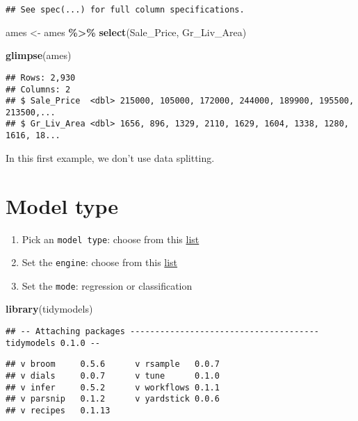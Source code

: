 \documentclass[
]{book}
\newenvironment{Shaded}{\begin{snugshade}}{\end{snugshade}}
\newcommand{\KeywordTok}[1]{\textcolor[rgb]{0.13,0.29,0.53}{\textbf{#1}}}
\newcommand{\NormalTok}[1]{#1}
\newcommand{\OperatorTok}[1]{\textcolor[rgb]{0.81,0.36,0.00}{\textbf{#1}}}
\newcommand{\StringTok}[1]{\textcolor[rgb]{0.31,0.60,0.02}{#1}}
\providecommand{\tightlist}{%
  \setlength{\itemsep}{0pt}\setlength{\parskip}{0pt}}
\begin{document}
\begin{verbatim}
## See spec(...) for full column specifications.
\end{verbatim}

\begin{Shaded}
\begin{Highlighting}[]
\NormalTok{ames \textless{}{-}}\StringTok{ }
\StringTok{  }\NormalTok{ames }\OperatorTok{\%\textgreater{}\%}
\StringTok{  }\KeywordTok{select}\NormalTok{(Sale\_Price, Gr\_Liv\_Area)}

\KeywordTok{glimpse}\NormalTok{(ames)}
\end{Highlighting}
\end{Shaded}

\begin{verbatim}
## Rows: 2,930
## Columns: 2
## $ Sale_Price  <dbl> 215000, 105000, 172000, 244000, 189900, 195500, 213500,...
## $ Gr_Liv_Area <dbl> 1656, 896, 1329, 2110, 1629, 1604, 1338, 1280, 1616, 18...
\end{verbatim}

In this first example, we don't use data splitting.

\hypertarget{model-type}{%
\section{Model type}\label{model-type}}

\begin{enumerate}
\def\labelenumi{\arabic{enumi}.}
\tightlist
\item
  Pick an \texttt{model\ type}: choose from this \href{https://www.tidymodels.org/find/parsnip/}{list}
\item
  Set the \texttt{engine}: choose from this \href{https://www.tidymodels.org/find/parsnip/}{list}
\item
  Set the \texttt{mode}: regression or classification
\end{enumerate}

\begin{Shaded}
\begin{Highlighting}[]
\KeywordTok{library}\NormalTok{(tidymodels)}
\end{Highlighting}
\end{Shaded}

\begin{verbatim}
## -- Attaching packages -------------------------------------- tidymodels 0.1.0 --
\end{verbatim}

\begin{verbatim}
## v broom     0.5.6      v rsample   0.0.7 
## v dials     0.0.7      v tune      0.1.0 
## v infer     0.5.2      v workflows 0.1.1 
## v parsnip   0.1.2      v yardstick 0.0.6 
## v recipes   0.1.13
\end{verbatim}
\end{document}
